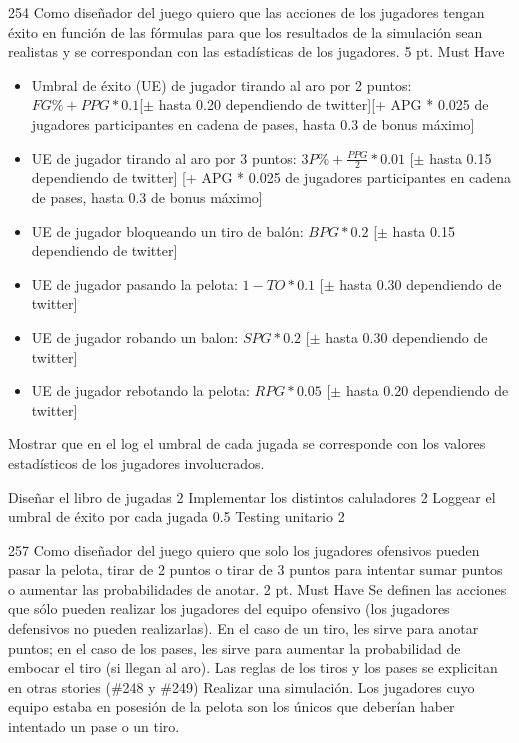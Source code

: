 \vspace{1cm}


\sprintstory
{254}
{Como diseñador del juego quiero que las acciones de los jugadores tengan éxito en función de las fórmulas para que los resultados de la simulación sean realistas y se correspondan con las estadísticas de los jugadores.}
{5 pt.}
{Must Have}
{\begin{itemize}
    \item Umbral de éxito (UE) de jugador tirando al aro por 2 puntos: $FG\% + PPG*0.1 $[$\pm$ hasta 0.20 dependiendo de twitter][+ APG * 0.025 de jugadores participantes en cadena de pases, hasta 0.3 de bonus máximo] 
    \item UE de jugador tirando al aro por 3 puntos: $3P\% + \frac{PPG}{2}* 0.01$ [$\pm$ hasta 0.15 dependiendo de twitter] [+ APG * 0.025 de jugadores participantes en cadena de pases, hasta 0.3 de bonus máximo]
    \item UE de jugador bloqueando un tiro de balón: $BPG * 0.2$ [$\pm$ hasta 0.15 dependiendo de twitter]
    \item UE de jugador pasando la pelota: $1 - TO * 0.1$ [$\pm$ hasta 0.30 dependiendo de twitter]
    \item UE de jugador robando un balon: $SPG * 0.2$ [$\pm$ hasta 0.30 dependiendo de twitter]
    \item UE de jugador rebotando la pelota: $RPG * 0.05$ [$\pm$ hasta 0.20 dependiendo de twitter]
\end{itemize}}
{Mostrar que en el log el umbral de cada jugada se corresponde con los valores estadísticos de los jugadores involucrados.}

\begin{taskstable}
 \task
 {Diseñar el libro de jugadas}
 {2}
 \task
 {Implementar los distintos caluladores}
 {2}
 \task
 {Loggear el umbral de éxito por cada jugada}
 {0.5}
 \task
 {Testing unitario}
 {2}
\end{taskstable}

\vspace{1cm}


\sprintstory
{257}
{Como diseñador del juego quiero que solo los jugadores ofensivos pueden pasar la pelota, tirar de 2 puntos o tirar de 3 puntos para intentar sumar puntos o aumentar las probabilidades de anotar.}
{2 pt.}
{Must Have}
{Se definen las acciones que sólo pueden realizar los jugadores del equipo ofensivo (los jugadores defensivos no pueden realizarlas). En el caso
de un tiro, les sirve para anotar puntos; en el caso de los pases, les sirve para aumentar la probabilidad de embocar el tiro (si llegan al aro).
Las reglas de los tiros y los pases se explicitan en otras stories (\#248 y \#249)}
{Realizar una simulación. Los jugadores cuyo equipo estaba en posesión de la pelota son los únicos que deberían haber intentado un pase o un tiro.}

